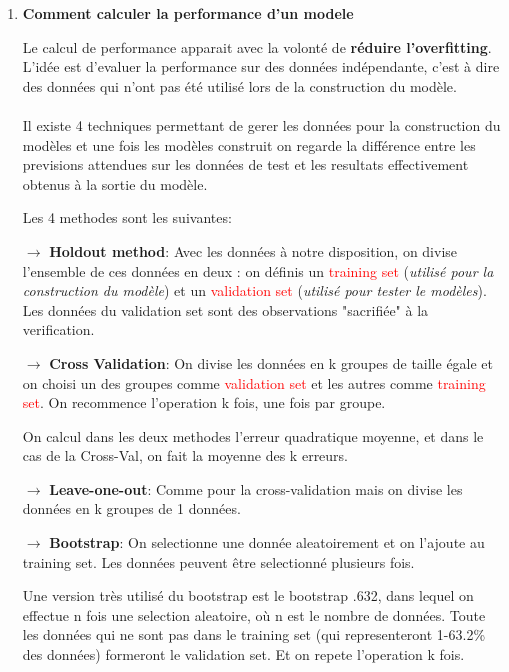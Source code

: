 \documentclass[a4paper, 11pt, onecolumn]{article}
\begin{document}
\begin{enumerate}
\item \textbf{Comment calculer la performance d'un modele}

  Le calcul de performance apparait avec la volonté de \textbf{réduire l'overfitting}. L'idée est d'evaluer la performance sur des données indépendante, c'est à dire des données qui n'ont pas été utilisé lors de la construction du modèle.

  \paragraph{}
Il existe 4 techniques permettant de gerer les données pour la construction du modèles et une fois les modèles construit on regarde la différence entre les previsions attendues sur les données de test et les resultats effectivement obtenus à la sortie du modèle.

Les 4 methodes sont les suivantes:

$\rightarrow$ \textbf{Holdout method}: Avec les données à notre disposition, on divise l'ensemble de ces données en deux : on définis un \textcolor{red}{training set} (\textit{utilisé pour la construction du modèle}) et un \textcolor{red}{validation set} (\textit{utilisé pour tester le modèles}). Les données du validation set sont des observations "sacrifiée" à la verification.

$\rightarrow$ \textbf{Cross Validation}: On divise les données en k groupes de taille égale et on choisi un des groupes comme \textcolor{red}{validation set} et les autres comme \textcolor{red}{training set}. On recommence l'operation k fois, une fois par groupe. 

On calcul dans les deux methodes l'erreur quadratique moyenne, et dans le cas de la Cross-Val, on fait la moyenne des k erreurs.

$\rightarrow$ \textbf{Leave-one-out}: Comme pour la cross-validation mais on divise les données en k groupes de 1 données. 

$\rightarrow$ \textbf{Bootstrap}: On selectionne une donnée aleatoirement et on l'ajoute au training set. Les données peuvent être selectionné plusieurs fois. 

Une version très utilisé du bootstrap est le bootstrap .632, dans lequel on effectue n fois une selection aleatoire,  où n est le nombre de données.
Toute les données qui ne sont pas dans le training set (qui representeront 1-63.2\% des données) formeront le validation set.
Et on repete l'operation k fois.


\end{enumerate}
\end{document}
